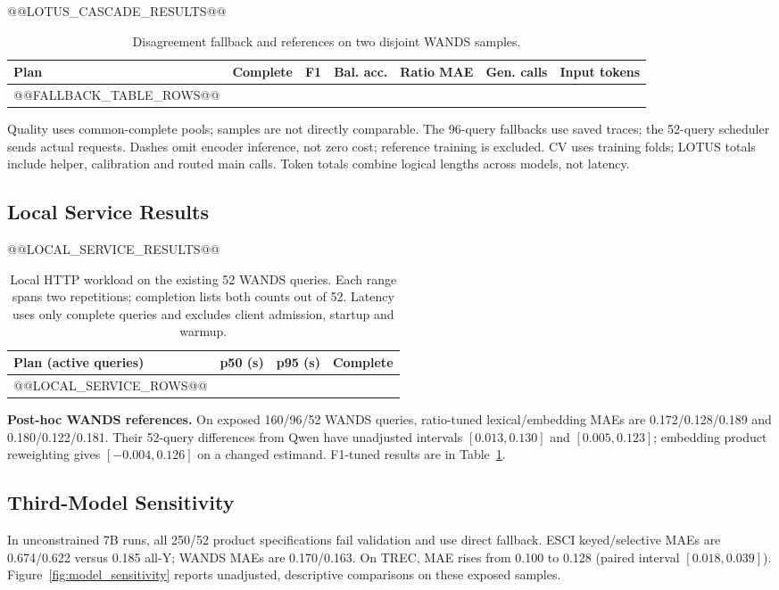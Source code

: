 \documentclass[conference]{IEEEtran}
\begin{document}
@@LOTUS_CASCADE_RESULTS@@

\begin{table}[t]
\caption{Disagreement fallback and references on two disjoint WANDS samples.}
\label{tab:fallback}
\centering\small
\begin{tabular}{lrrrrrr}
\toprule
Plan & Complete & F1 & Bal. acc. & Ratio MAE & Gen. calls & Input tokens \\
\midrule
@@FALLBACK_TABLE_ROWS@@
\bottomrule
\end{tabular}
\par\smallskip
\begin{minipage}{0.94\textwidth}\footnotesize
Quality uses common-complete pools; samples are not directly comparable. The 96-query fallbacks use saved traces; the 52-query scheduler sends actual requests. Dashes omit encoder inference, not zero cost; reference training is excluded. CV uses training folds; LOTUS totals include helper, calibration and routed main calls. Token totals combine logical lengths across models, not latency.
\end{minipage}
\end{table}

\subsection{Local Service Results}
@@LOCAL_SERVICE_RESULTS@@

\begin{table}[t]
\caption{Local HTTP workload on the existing 52 WANDS queries. Each range spans two repetitions; completion lists both counts out of 52. Latency uses only complete queries and excludes client admission, startup and warmup.}
\label{tab:local_service}
\centering\footnotesize
\begin{tabular}{lrrr}
\toprule
Plan (active queries) & p50 (s) & p95 (s) & Complete \\
\midrule
@@LOCAL_SERVICE_ROWS@@
\bottomrule
\end{tabular}
\end{table}

\textbf{Post-hoc WANDS references.} On exposed 160/96/52 WANDS queries, ratio-tuned lexical/embedding MAEs are 0.172/0.128/0.189 and 0.180/0.122/0.181. Their 52-query differences from Qwen have unadjusted intervals $[0.013,0.130]$ and $[0.005,0.123]$; embedding product reweighting gives $[-0.004,0.126]$ on a changed estimand. F1-tuned results are in Table~\ref{tab:fallback}.

\subsection{Third-Model Sensitivity}
In unconstrained 7B runs, all 250/52 product specifications fail validation and use direct fallback. ESCI keyed/selective MAEs are 0.674/0.622 versus 0.185 all-Y; WANDS MAEs are 0.170/0.163. On TREC, MAE rises from 0.100 to 0.128 (paired interval $[0.018,0.039]$). Figure~\ref{fig:model_sensitivity} reports unadjusted, descriptive comparisons on these exposed samples.
\end{document}
